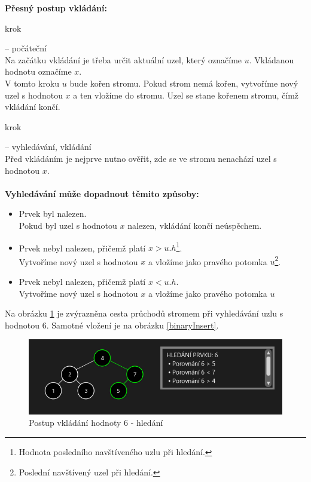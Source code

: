 \documentclass[
  biblatex=false,
  font=serif,
  glossaries=false,
  tables=false,
  theorems=false,
  index
]{kidiplom}
\makeatletter
\newcommand\footnoteref[1]{\protected@xdef\@thefnmark{\ref{#1}}\@footnotemark}
\makeatother
\begin{document}
\noindent \textbf{Přesný postup vkládání:}
\begin{enumerate} {\bfseries
\item  krok} -- počáteční \\
Na začátku vkládání je třeba určit aktuální uzel, který označíme $u$. Vkládanou hodnotu označíme $x$.\\
V tomto kroku $u$ bude kořen stromu. Pokud strom nemá kořen, vytvoříme nový uzel s hodnotou $x$ a ten vložíme do stromu. Uzel se stane kořenem stromu, čímž vkládání končí.
{\bfseries\item  krok} -- vyhledávání, vkládání \\
Před vkládáním je nejprve nutno ověřit, zde se ve stromu nenachází uzel s hodnotou $x$.\\\\
\textbf{Vyhledávání může dopadnout těmito způsoby:}
\begin{itemize}
\item Prvek byl nalezen. \\
Pokud byl uzel s hodnotou $x$ nalezen, vkládání končí neúspěchem.
\item Prvek nebyl nalezen, přičemž platí $x > u.h$\footnote{\label{hodnotaPosledniho}Hodnota posledního navštíveného uzlu při hledání.}.\\
Vytvoříme nový uzel s hodnotou $x$ a vložíme jako pravého potomka $u$\footnote{\label{posledni}Poslední navštívený uzel při hledání.}.
\item Prvek nebyl nalezen, přičemž platí $x < u.h$\footnoteref{hodnotaPosledniho}.\\
Vytvoříme nový uzel s hodnotou $x$ a vložíme jako pravého potomka $u$\footnoteref{posledni}
\end{itemize}
\end{enumerate}

\medskip
\noindent Na obrázku \ref{binarySearchInsert} je zvýrazněna cesta průchodů stromem při vyhledávání uzlu s hodnotou 6. Samotné vložení je na obrázku \ref{binaryInsert}.

\begin{figure}[h!]
\centering
	\includegraphics[scale=0.9]{obrazky/6BinarniVkladani1.png}
	\caption{Postup vkládání hodnoty 6 - hledání}
	\label{binarySearchInsert}
\end{figure}
\end{document}
